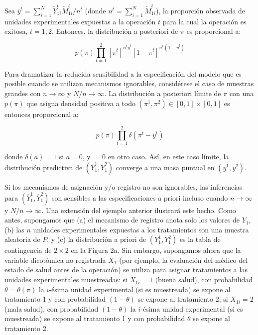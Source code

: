\documentclass[12pt,a4paper]{article}
\begin{document}
Sea $\overline{y}^t = \sum_{i=1}^N \tilde{Y}_{1i}^t \tilde{M}_{1i}^t / n^t$ (donde $n^t = \sum_{i=1}^N \tilde{M}_{1i}^t$), la proporción observada de unidades experimentales expuestas a la operación $t$ para la cual la operación es exitosa, $t=1, 2$. Entonces, la distribución a posteriori de $\pi$ es proporcional a:

\begin{equation}\label{eq:4.5}
p(\pi) \prod_{t=1}^2 [\pi^t]^{n^t \overline{y}^t} [1-\pi^t]^{n^t(1-\overline{y}^t)} \tag{4.5}
\end{equation}

Para dramatizar la reducida sensibilidad a la especificación del modelo que es posible cuando se utilizan mecanismos ignorables, considérese el caso de muestras grandes con $n \rightarrow \infty$ y $N/n \rightarrow \infty$. La distribución a posteriori límite de $\pi$ con una $p(\pi)$ que asigna densidad positiva a todo $(\pi^1, \pi^2) \in [0,1] \times [0,1]$ es entonces proporcional a:

\begin{equation}\label{eq:4.6}
p(\pi)\prod_{t=1}^2 \delta(\pi^t - \overline{y}^t) \tag{4.6}
\end{equation}

\noindent donde $\delta(a)=1$ si $a=0$, y $=0$ en otro caso. Así, en este caso límite, la distribución predictiva de $(\overline{Y}_1^1, \overline{Y}_1^2)$ converge a una masa puntual en $(\overline{y}^1, \overline{y}^2)$.

Si los mecanismos de asignación y/o registro no son ignorables, las inferencias para $(\overline{Y}_1^1, \overline{Y}_1^2)$ son sensibles a las especificaciones a priori incluso cuando $n \rightarrow \infty$ y $N/n \rightarrow \infty$. Una extensión del ejemplo anterior ilustrará este hecho. Como antes, supongamos que (a) el mecanismo de registro anota solo los valores de $Y_1$, (b) las $n$ unidades experimentales expuestas a los tratamientos son una muestra aleatoria de $P$, y (c) la distribución a priori de $(Y_1^1, Y_1^2)$ es la tabla de contingencia de $2 \times 2$ en la Figura 2a. Sin embargo, supongamos ahora que la variable dicotómica no registrada $X_1$ (por ejemplo, la evaluación del médico del estado de salud antes de la operación) se utiliza para asignar tratamientos a las unidades experimentales muestreadas: si $X_{1i}=1$ (buena salud), con probabilidad $\theta = \theta(\pi)$ la $i$-ésima unidad experimental (si es muestreada) se expone al tratamiento 1 y con probabilidad $(1-\theta)$ se expone al tratamiento 2; si $X_{1i}=2$ (mala salud), con probabilidad $(1-\theta)$ la $i$-ésima unidad experimental (si es muestreada) se expone al tratamiento 1 y con probabilidad $\theta$ se expone al tratamiento 2.
\end{document}
